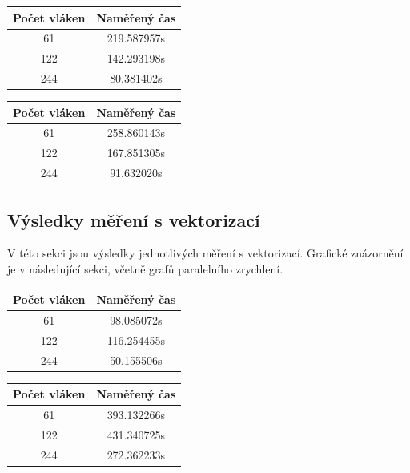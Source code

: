 \documentclass[12pt]{article}
\begin{document}
\begin{table}[H]
\parbox{.45\linewidth}{
%
%
\begin{center}
\begin{tabular}{ c | c }
\textbf{Počet vláken} & \textbf{Naměřený čas} \\ \hline \hline 
61 & 219.587957s \\ \hline
122 & 142.293198s \\ \hline
244 & 80.381402s \\ \hline
\end{tabular}
\end{center}
}
\hfill
\parbox{.45\linewidth}{
%
%
\begin{center}
\begin{tabular}{ c | c }
\textbf{Počet vláken} & \textbf{Naměřený čas} \\ \hline \hline 
61 & 258.860143s \\ \hline
122 & 167.851305s \\ \hline
244 & 91.632020s \\ \hline
\end{tabular}
\end{center}
}
\end{table}

\subsection{Výsledky měření s vektorizací}
V této sekci jsou výsledky jednotlivých měření s vektorizací.
Grafické znázornění je v následující sekci, včetně grafů paralelního zrychlení.
\begin{table}[H]
\parbox{.45\linewidth}{
%
%
\begin{center}
\begin{tabular}{ c | c }
\textbf{Počet vláken} & \textbf{Naměřený čas} \\ \hline \hline 
61 & 98.085072s \\ \hline
122 & 116.254455s \\ \hline
244 & 50.155506s \\ \hline
\end{tabular}
\end{center}
}
\hfill
\parbox{.45\linewidth}{
%
%
\begin{center}
\begin{tabular}{ c | c }
\textbf{Počet vláken} & \textbf{Naměřený čas} \\ \hline \hline 
61 & 393.132266s \\ \hline
122 & 431.340725s \\ \hline
244 & 272.362233s \\ \hline
\end{tabular}
\end{center}
}
\end{table}
\end{document}
